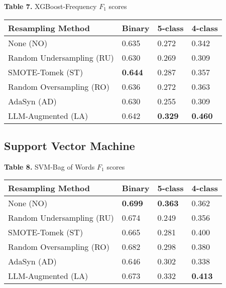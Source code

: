 \documentclass[runningheads]{llncs}
\newenvironment{nscenter}
 {\parskip=0pt\par\nopagebreak\centering}
 {\par\noindent\ignorespacesafterend}
\begin{document}
\begin{nscenter}
{\bf Table 7.} XGBoost-Frequency $F_1$ scores\\

\begin{tabular}{|l|l|l|l|}
\hline
Resampling Method & Binary & 5-class & 4-class \\\hline
None (NO) & 0.635 & 0.272 & 0.342 \\\hline
Random Undersampling (RU) & 0.630 & 0.269 & 0.309 \\\hline
SMOTE-Tomek (ST) & {\bf 0.644} & 0.287 & 0.357 \\\hline
Random Oversampling (RO) & 0.636 & 0.272 & 0.363 \\\hline
AdaSyn (AD) & 0.630 & 0.255 & 0.309 \\\hline
LLM-Augmented (LA) & 0.642 & {\bf 0.329} & {\bf 0.460} \\\hline
\end{tabular}
\end{nscenter}

\subsection{Support Vector Machine}

\clearpage
\begin{nscenter}
{\bf Table 8.} SVM-Bag of Words $F_1$ scores\\

\begin{tabular}{|l|l|l|l|}
\hline
Resampling Method & Binary & 5-class & 4-class \\\hline
None (NO) & {\bf 0.699} & {\bf 0.363} & 0.362 \\\hline
Random Undersampling (RU) & 0.674 & 0.249 & 0.356 \\\hline
SMOTE-Tomek (ST) & 0.665 & 0.281 & 0.400 \\\hline
Random Oversampling (RO) & 0.682 & 0.298 & 0.380 \\\hline
AdaSyn (AD) & 0.646 & 0.302 & 0.338 \\\hline
LLM-Augmented (LA) & 0.673 & 0.332 & {\bf 0.413} \\\hline
\end{tabular}
\end{nscenter}
\end{document}
